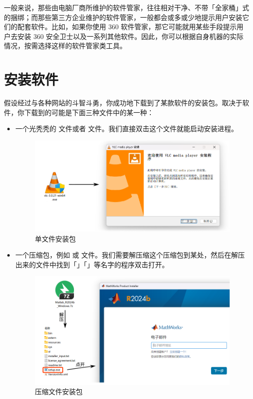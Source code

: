 一般来说，那些由电脑厂商所维护的软件管家，往往相对干净、不带「全家桶」式的捆绑；而那些第三方企业维护的软件管家，一般都会或多或少地提示用户安装它们的配套软件。比如，如果你使用 360 软件管家，那它可能就用某些手段提示用户去安装 360 安全卫士以及一系列其他软件。因此，你可以根据自身机器的实际情况，按需选择这样的软件管家类工具。

\section{安装软件}

假设经过与各种网站的斗智斗勇，你成功地下载到了某款软件的安装包。取决于软件，你下载到的可能是下面三种文件中的某一种：

\begin{itemize}
  \item 一个光秃秃的  文件或者  文件。我们直接双击这个文件就能启动安装进程。
    \begin{figure}[htb!]
      \centering
      \includegraphics[width=.6\textwidth]{assets/basic/Single_file_installer.png}
      \caption{单文件安装包}
      \label{fig:Single_file_installer}
    \end{figure}
  \item 一个压缩包，例如  或  文件。我们需要解压缩这个压缩包到某处，然后在解压出来的文件中找到「」「」等名字的程序双击打开。
    \begin{figure}[htb!]
      \centering
      \includegraphics[width=.6\textwidth]{assets/basic/Archive_installer.png}
      \caption{压缩文件安装包}
      \label{fig:Archive_installer}
    \end{figure}

\end{itemize}
